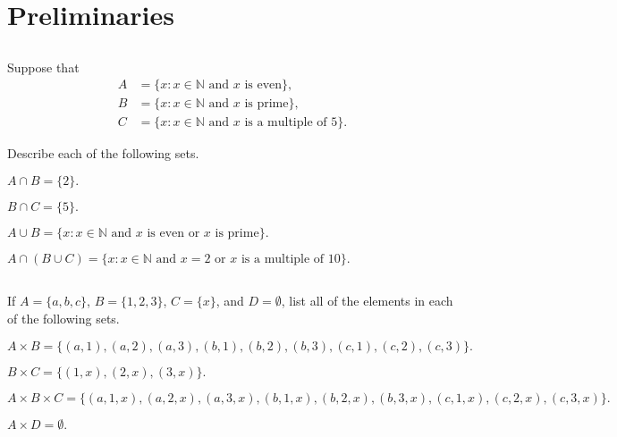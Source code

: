 \chapter{Preliminaries}\label{ch:preliminaries}

\section{}\label{sec:1}

Suppose that
\begin{align*}
A &= \{ x : x \in \mathbb{N} \text{ and } x \text{ is even}\}, \\
B &= \{ x : x \in \mathbb{N} \text{ and } x \text{ is prime}\}, \\
C &= \{ x : x \in \mathbb{N} \text{ and } x \text{ is a multiple of 5}\}.
\end{align*}

Describe each of the following sets.
\hr
\begin{exlist}
    \item $A \cap B = \{ 2 \}.$
    \item $B \cap C = \{ 5 \}.$
    \item $A \cup B = \{ x : x \in \mathbb{N} \text{ and } x \text{ is even or } x \text{ is prime}\}.$
    \item $A \cap (B \cup C) = \{ x : x \in \mathbb{N} \text{ and } x = 2 \text{ or } x \text{ is a multiple of 10}\}.$
\end{exlist}

\section{}\label{sec:2}

If $A = \{ a, b, c \}$, $B = \{ 1, 2, 3 \}$, $C = \{ x \}$, and $D = \emptyset$, list all of the elements in each of the following sets.
\hr
\begin{exlist}
    \item $A \times B = \{ (a,1), (a,2), (a,3), (b,1), (b,2), (b,3), (c,1), (c,2), (c,3)\}.$
    \item $B \times C = \{ (1,x), (2,x), (3,x)\}.$
    \item $A \times B \times C = \{ (a,1,x), (a,2,x), (a,3,x), (b,1,x), (b,2,x), (b,3,x), (c,1,x), (c,2,x), (c,3,x)\}.$
    \item $A \times D = \emptyset.$
\end{exlist}
\pagebreak
\section{}\label{sec:3}

